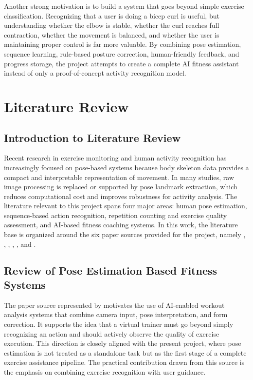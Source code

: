 \documentclass[12pt,a4paper]{report}
\begin{document}
Another strong motivation is to build a system that goes beyond simple exercise classification. Recognizing that a user is doing a bicep curl is useful, but understanding whether the elbow is stable, whether the curl reaches full contraction, whether the movement is balanced, and whether the user is maintaining proper control is far more valuable. By combining pose estimation, sequence learning, rule-based posture correction, human-friendly feedback, and progress storage, the project attempts to create a complete AI fitness assistant instead of only a proof-of-concept activity recognition model.




\chapter{Literature Review}

\section{Introduction to Literature Review}
Recent research in exercise monitoring and human activity recognition has increasingly focused on pose-based systems because body skeleton data provides a compact and interpretable representation of movement. In many studies, raw image processing is replaced or supported by pose landmark extraction, which reduces computational cost and improves robustness for activity analysis. The literature relevant to this project spans four major areas: human pose estimation, sequence-based action recognition, repetition counting and exercise quality assessment, and AI-based fitness coaching systems. In this work, the literature base is organized around the six paper sources provided for the project, namely \cite{ai_trainer_paper}, \cite{yoga_arxiv}, \cite{paper_1374}, \cite{ijsret_1052}, \cite{icacc2021_03031}, and \cite{visapp_2024_266}.

\section{Review of Pose Estimation Based Fitness Systems}
The paper source represented by \cite{ai_trainer_paper} motivates the use of AI-enabled workout analysis systems that combine camera input, pose interpretation, and form correction. It supports the idea that a virtual trainer must go beyond simply recognizing an action and should actively observe the quality of exercise execution. This direction is closely aligned with the present project, where pose estimation is not treated as a standalone task but as the first stage of a complete exercise assistance pipeline. The practical contribution drawn from this source is the emphasis on combining exercise recognition with user guidance.
\end{document}
